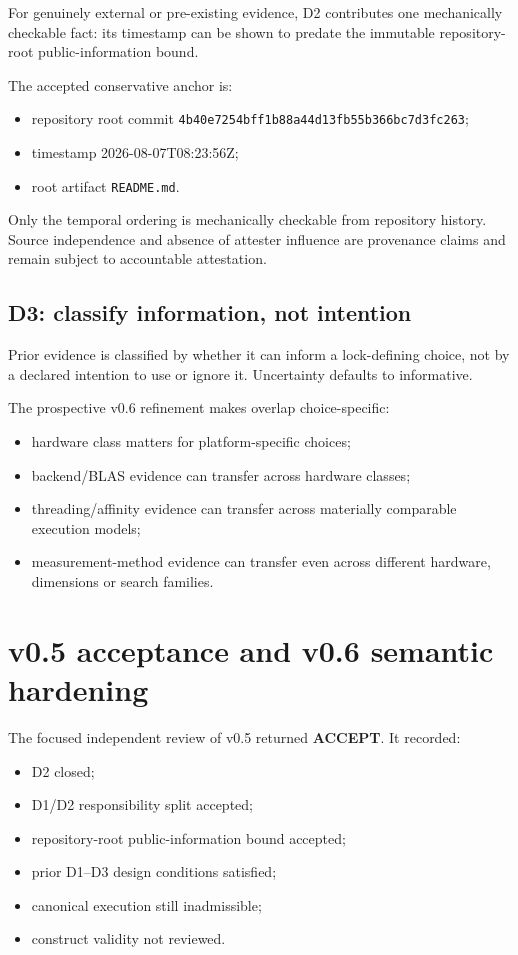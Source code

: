 \documentclass[10pt,a4paper]{article}
\newcommand{\code}[1]{\texttt{#1}}
\begin{document}
For genuinely external or pre-existing evidence, D2 contributes one mechanically checkable fact: its timestamp
can be shown to predate the immutable repository-root public-information bound.

The accepted conservative anchor is:

\begin{itemize}
\item repository root commit \code{4b40e7254bff1b88a44d13fb55b366bc7d3fc263};
\item timestamp 2026-08-07T08:23:56Z;
\item root artifact \code{README.md}.
\end{itemize}

Only the temporal ordering is mechanically checkable from repository history. Source independence and absence
of attester influence are provenance claims and remain subject to accountable attestation.

\subsection{D3: classify information, not intention}

Prior evidence is classified by whether it can inform a lock-defining choice, not by a declared intention to
use or ignore it. Uncertainty defaults to informative.

The prospective v0.6 refinement makes overlap choice-specific:

\begin{itemize}
\item hardware class matters for platform-specific choices;
\item backend/BLAS evidence can transfer across hardware classes;
\item threading/affinity evidence can transfer across materially comparable execution models;
\item measurement-method evidence can transfer even across different hardware, dimensions or search families.
\end{itemize}

\section{v0.5 acceptance and v0.6 semantic hardening}

The focused independent review of v0.5 returned \textbf{ACCEPT}. It recorded:

\begin{itemize}
\item D2 closed;
\item D1/D2 responsibility split accepted;
\item repository-root public-information bound accepted;
\item prior D1--D3 design conditions satisfied;
\item canonical execution still inadmissible;
\item construct validity not reviewed.
\end{itemize}
\end{document}
